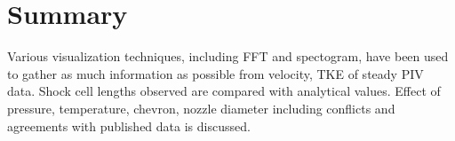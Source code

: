  
\section{Summary}

Various visualization techniques, including FFT and spectogram, have been used to gather as much information as possible from velocity, TKE of steady PIV data. Shock cell lengths observed are compared with analytical values. Effect of pressure, temperature, chevron, nozzle diameter including conflicts and agreements with published data is discussed. 

%